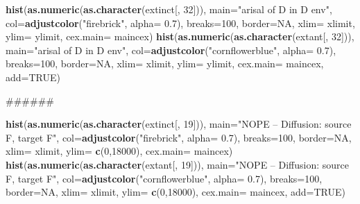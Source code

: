 \documentclass[]{book}
\newenvironment{Shaded}{\begin{snugshade}}{\end{snugshade}}
\newcommand{\KeywordTok}[1]{\textcolor[rgb]{0.13,0.29,0.53}{\textbf{{#1}}}}
\newcommand{\DataTypeTok}[1]{\textcolor[rgb]{0.13,0.29,0.53}{{#1}}}
\newcommand{\DecValTok}[1]{\textcolor[rgb]{0.00,0.00,0.81}{{#1}}}
\newcommand{\FloatTok}[1]{\textcolor[rgb]{0.00,0.00,0.81}{{#1}}}
\newcommand{\StringTok}[1]{\textcolor[rgb]{0.31,0.60,0.02}{{#1}}}
\newcommand{\OtherTok}[1]{\textcolor[rgb]{0.56,0.35,0.01}{{#1}}}
\newcommand{\NormalTok}[1]{{#1}}
\theoremstyle{definition}
\theoremstyle{definition}
\theoremstyle{remark}
\begin{document}
\begin{Shaded}
\begin{Highlighting}[]
\KeywordTok{hist}\NormalTok{(}\KeywordTok{as.numeric}\NormalTok{(}\KeywordTok{as.character}\NormalTok{(extinct[, }\DecValTok{32}\NormalTok{])), }\DataTypeTok{main=}\StringTok{"arisal of D in D env"}\NormalTok{, }\DataTypeTok{col=}\KeywordTok{adjustcolor}\NormalTok{(}\StringTok{"firebrick"}\NormalTok{, }\DataTypeTok{alpha=} \FloatTok{0.7}\NormalTok{), }\DataTypeTok{breaks=}\DecValTok{100}\NormalTok{, }\DataTypeTok{border=}\OtherTok{NA}\NormalTok{, }\DataTypeTok{xlim=}\NormalTok{ xlimit, }\DataTypeTok{ylim=}\NormalTok{ ylimit, }\DataTypeTok{cex.main=}\NormalTok{ maincex)}
\KeywordTok{hist}\NormalTok{(}\KeywordTok{as.numeric}\NormalTok{(}\KeywordTok{as.character}\NormalTok{(extant[, }\DecValTok{32}\NormalTok{])), }\DataTypeTok{main=}\StringTok{"arisal of D in D env"}\NormalTok{, }\DataTypeTok{col=}\KeywordTok{adjustcolor}\NormalTok{(}\StringTok{"cornflowerblue"}\NormalTok{, }\DataTypeTok{alpha=} \FloatTok{0.7}\NormalTok{), }\DataTypeTok{breaks=}\DecValTok{100}\NormalTok{, }\DataTypeTok{border=}\OtherTok{NA}\NormalTok{, }\DataTypeTok{xlim=}\NormalTok{ xlimit, }\DataTypeTok{ylim=}\NormalTok{ ylimit, }\DataTypeTok{cex.main=}\NormalTok{ maincex, }\DataTypeTok{add=}\OtherTok{TRUE}\NormalTok{)}

\NormalTok{######}

\KeywordTok{hist}\NormalTok{(}\KeywordTok{as.numeric}\NormalTok{(}\KeywordTok{as.character}\NormalTok{(extinct[, }\DecValTok{19}\NormalTok{])), }\DataTypeTok{main=}\StringTok{"NOPE -- Diffusion: source F, target F"}\NormalTok{, }\DataTypeTok{col=}\KeywordTok{adjustcolor}\NormalTok{(}\StringTok{"firebrick"}\NormalTok{, }\DataTypeTok{alpha=} \FloatTok{0.7}\NormalTok{), }\DataTypeTok{breaks=}\DecValTok{100}\NormalTok{, }\DataTypeTok{border=}\OtherTok{NA}\NormalTok{, }\DataTypeTok{xlim=}\NormalTok{ xlimit, }\DataTypeTok{ylim=} \KeywordTok{c}\NormalTok{(}\DecValTok{0}\NormalTok{,}\DecValTok{18000}\NormalTok{), }\DataTypeTok{cex.main=}\NormalTok{ maincex)}
\KeywordTok{hist}\NormalTok{(}\KeywordTok{as.numeric}\NormalTok{(}\KeywordTok{as.character}\NormalTok{(extant[, }\DecValTok{19}\NormalTok{])), }\DataTypeTok{main=}\StringTok{"NOPE -- Diffusion: source F, target F"}\NormalTok{, }\DataTypeTok{col=}\KeywordTok{adjustcolor}\NormalTok{(}\StringTok{"cornflowerblue"}\NormalTok{, }\DataTypeTok{alpha=} \FloatTok{0.7}\NormalTok{), }\DataTypeTok{breaks=}\DecValTok{100}\NormalTok{, }\DataTypeTok{border=}\OtherTok{NA}\NormalTok{, }\DataTypeTok{xlim=}\NormalTok{ xlimit, }\DataTypeTok{ylim=} \KeywordTok{c}\NormalTok{(}\DecValTok{0}\NormalTok{,}\DecValTok{18000}\NormalTok{), }\DataTypeTok{cex.main=}\NormalTok{ maincex, }\DataTypeTok{add=}\OtherTok{TRUE}\NormalTok{)}




\end{Highlighting}
\end{Shaded}
\end{document}
